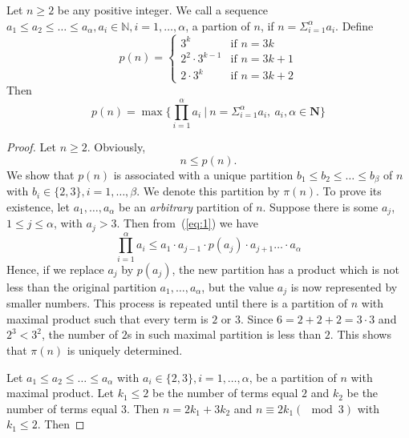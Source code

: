 \begin{lemma}\label{lemma:minhitmax}
Let $n\ge 2$ be any positive integer.
We call a sequence $a_1\le a_2\le \ldots\le  a_{\alpha}, a_i\in \mathbb{N}, i=1,\dots, \alpha$, a partion of $n$, if $n=\Sigma_{i=1}^{\alpha}a_i$.
Define
$$p(n)=\begin{cases} 3^k &\text{if}\,\, n=3k\\ 2^2\cdot 3^{k-1} &\text{if}\,\, n=3k+1\\2\cdot 3^{k} &\text{if}\,\, n=3k+2\end{cases}$$
Then  $$p(n)=\max\big\{\prod_{i=1}^{\alpha}a_i~|~n=\Sigma_{i=1}^{\alpha}a_i,\ a_i,
\alpha\in \mathbf{N}\big\}$$
\end{lemma}
\begin{proof}
Let $n\ge 2$.
Obviously, 
\begin{equation}\label{eq:1} 
   n\le p(n).
\end{equation}
We show that
$p(n)$ is associated with a unique partition  $b_1\le b_2\le \ldots\le  b_{\beta}$ of $n$ with $b_i\in \{2,3\}, i=1,\dots,\beta$. We denote this partition  by $\pi(n)$. 
To prove its existence, 
let $a_1, \ldots , a_{\alpha}$ be an {\it arbitrary} partition of $n$. 
Suppose there is some $a_j$, $1\le j\le \alpha$, with $a_j>3$. Then from~(\ref{eq:1}) we have 
$$
\prod_{i=1}^{\alpha}a_i\le a_1\cdot a_{j-1}\cdot p(a_j)\cdot a_{j+1}\ldots\cdot a_{\alpha}$$
Hence, if we replace $a_j$ by $p(a_j)$, the new partition has a product which is
 not less than the original partition $a_1, \ldots , a_{\alpha}$, but the value $a_j$
 is now represented by smaller numbers. This process is repeated until there is a partition of $n$ with maximal product such that every term is $2$ or $3$.
Since $6=2+2+2=3\cdot 3$ and $2^3< 3^2$, the number of $2$s in such maximal partition is less than $2$. This shows that $\pi(n)$ is uniquely determined.

Let $a_1\le a_2\le \ldots\le  a_{\alpha}$ with $a_i\in \{2,3\}, i=1,\dots,\alpha$, be a partition of $n$ with maximal product. Let $k_1\le 2$ be the number of terms equal $2$ and $k_2$ be the number of terms equal $3$.
Then $n=2k_1+3k_2$ and  $n\equiv 2k_1 (\mod 3)$ with $k_1\le 2$. Then 


\end{proof}
